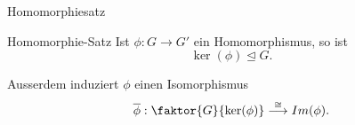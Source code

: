 \documentclass[class=article, crop=false]{standalone}
\begin{document}
\begin{zettel}{Homomorphiesatz}
\begin{flashcard}[2ssmahgl]{Homomorphie-Satz}
	Ist $\phi : G \longrightarrow  G'$ ein Homomorphismus, so ist \[
		\ker (\phi ) \trianglelefteq G
	.\]

	Ausserdem induziert $\phi $  einen Isomorphismus
	\[
		\bar{\phi } : \faktor{G}{ \ker (\phi )} \stackrel{\cong}{\longrightarrow} Im(\phi )
	.\]
\end{flashcard}
\end{zettel}
\end{document}
